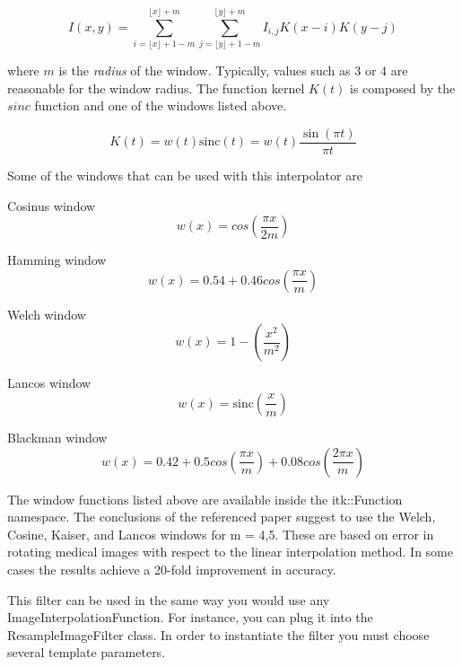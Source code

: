 \begin{equation}
I(x,y) =
\sum_{i = \lfloor x \rfloor + 1 - m}^{\lfloor x \rfloor + m}
\sum_{j = \lfloor y \rfloor + 1 - m}^{\lfloor y \rfloor + m}
I_{i,j} K(x-i) K(y-j)
\end{equation}

where $m$ is the \emph{radius} of the window. Typically, values such as 3 or 4
are reasonable for the window radius. The function kernel $K(t)$ is composed by
the $sinc$ function and one of the windows listed above.

\begin{equation}
K(t) = w(t) \textrm{sinc}(t) = w(t) \frac{\sin(\pi t)}{\pi t}
\end{equation}

Some of the windows that can be used with this interpolator are

Cosinus window
\begin{equation}
w(x) = cos ( \frac{\pi x}{2 m} )
\end{equation}


Hamming window
\begin{equation}
w(x) = 0.54 + 0.46 cos ( \frac{\pi x}{m} )
\end{equation}


Welch window
\begin{equation}
w(x) = 1 - ( \frac{x^2}{m^2} )
\end{equation}


Lancos window
\begin{equation}
w(x) = \textrm{sinc} ( \frac{x}{m} )
\end{equation}


Blackman window
\begin{equation}
w(x) = 0.42 + 0.5 cos(\frac{\pi x}{m}) + 0.08 cos(\frac{2 \pi x}{m})
\end{equation}


The window functions listed above are available inside the itk::Function
namespace. The conclusions of the referenced paper suggest to use the Welch,
Cosine, Kaiser, and Lancos windows for m = 4,5. These are based on error in
rotating medical images with respect to the linear interpolation method. In
some cases the results achieve a 20-fold improvement in accuracy.

This filter can be used in the same way you would use any
ImageInterpolationFunction. For instance, you can plug it into the
ResampleImageFilter class.  In order to instantiate the filter you must choose
several template parameters.

